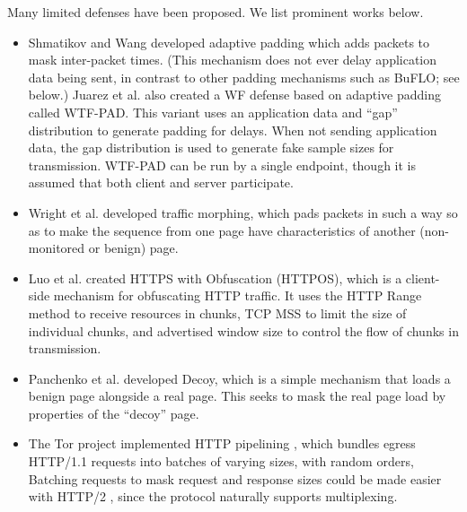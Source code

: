 \documentclass[runningheads]{llncs}
\begin{document}
Many limited defenses have been proposed. We list prominent works below.
\begin{itemize}
\item Shmatikov and Wang \cite{shmatikov2006timing} developed adaptive padding which adds packets to mask
inter-packet times. (This mechanism does not ever delay application data being sent, in contrast to other
padding mechanisms such as BuFLO; see below.)
Juarez et al. \cite{juarez2016toward} also created a WF defense based on adaptive padding called WTF-PAD.
This variant uses an application data and ``gap'' distribution to generate padding for delays. When
not sending application data, the gap distribution is used to generate fake sample sizes for transmission.
WTF-PAD can be run by a single endpoint, though it is assumed that both client and server participate.
\item Wright et al. \cite{wright2009traffic} developed traffic morphing, which pads packets in such a way
so as to make the sequence from one page have characteristics of another (non-monitored or benign) page.
\item Luo et al. \cite{luo2011httpos} created HTTPS with Obfuscation (HTTPOS), which is a client-side
mechanism for obfuscating HTTP traffic. It uses the HTTP Range method to receive resources in chunks, TCP
MSS to limit the size of individual chunks, and advertised window size to control the flow of chunks
in transmission.
\item Panchenko et al. \cite{panchenko2011website} developed Decoy, which is a simple mechanism that loads
a benign page alongside a real page. This seeks to mask the real page load by properties of the ``decoy'' page.
\item The Tor project implemented HTTP pipelining \cite{perry2011experimental}, which bundles egress HTTP/1.1
requests into batches of varying sizes, with random orders, Batching requests to mask request and response sizes
could be made easier with HTTP/2 \cite{rfc7540}, since the protocol naturally supports multiplexing.
\end{itemize}
\end{document}
